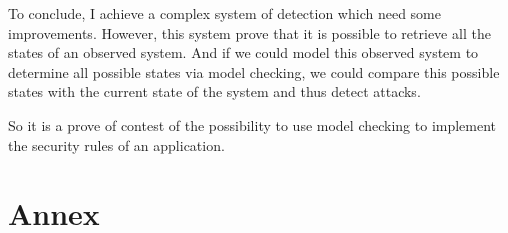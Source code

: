 \documentclass[a4paper, 11pt, oneside, oldfontcommands]{memoir}
\newcounter{th}[chapter]
\begin{document}
To conclude, I achieve a complex system of detection which need some improvements. However, this system prove that
it is possible to retrieve all the states of an observed system. And if we could model this observed system to
determine all possible states via model checking, we could compare this possible states with the current state of
the system and thus detect attacks.

So it is a prove of contest of the possibility to use model checking to implement the security rules of an
application.




\newpage


\part*{Annex}
\appendix
\nocite{*}

\newpage
 \listoffigures
 \printindex
 
  
\end{document}
